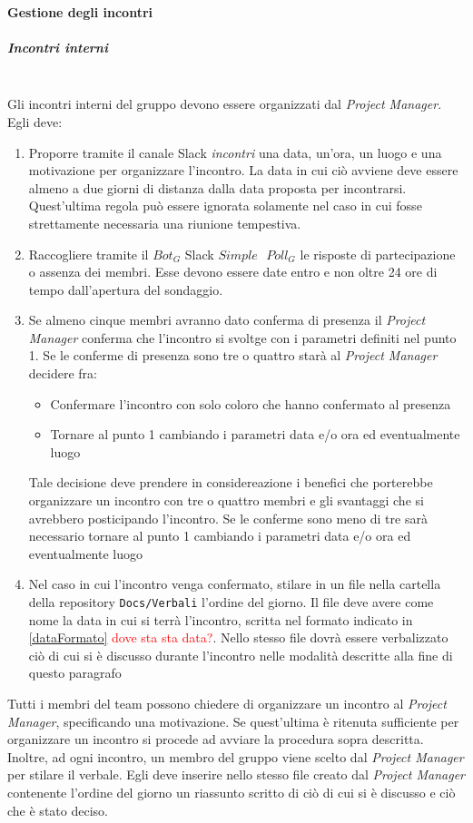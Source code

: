 		\paragraph{Gestione degli incontri}
			\subparagraph{Incontri interni} \mbox{} \\
			 Gli incontri interni del gruppo devono essere organizzati dal \emph{Project Manager}. Egli deve:
			\begin{enumerate}
				\item Proporre tramite il canale Slack \emph{incontri} una data, un'ora, un luogo e una motivazione per organizzare l'incontro. La data in cui ciò avviene deve essere almeno a due giorni di distanza dalla data proposta per incontrarsi. Quest'ultima regola può essere ignorata solamente nel caso in cui fosse strettamente necessaria una riunione tempestiva.
				
				\item Raccogliere tramite il $Bot_G$ Slack $Simple\textbf{ }Poll_G$ le risposte di partecipazione o assenza dei membri. Esse devono essere date entro e non oltre 24 ore di tempo dall'apertura del sondaggio.
				
				\item Se almeno cinque membri avranno dato conferma di presenza il \emph{Project Manager} conferma che l'incontro si svoltge con i parametri definiti nel punto 1. 
				Se le conferme di presenza sono tre o quattro starà al \emph{Project Manager} decidere fra: 
				\begin{itemize}
					\item Confermare l'incontro con solo coloro che hanno confermato al presenza
					\item Tornare al punto 1 cambiando i parametri data e/o ora ed eventualmente luogo
				\end{itemize}
				Tale decisione deve prendere in considereazione i benefici che porterebbe organizzare un incontro con tre o quattro membri e gli svantaggi che si avrebbero posticipando l'incontro.
				Se le conferme sono meno di tre sarà necessario tornare al punto 1 cambiando i parametri data e/o ora ed eventualmente luogo
				
				\item Nel caso in cui l'incontro venga confermato, stilare in un file nella cartella della repository \texttt{Docs/Verbali} l'ordine del giorno. Il file deve avere come nome la data in cui si terrà l'incontro, scritta nel formato indicato in \ref{dataFormato} \textcolor{red}{dove sta sta data?}. Nello stesso file dovrà essere verbalizzato ciò di cui si è discusso durante l'incontro nelle modalità descritte alla fine di questo paragrafo
			\end{enumerate}
			Tutti i membri del team possono chiedere di organizzare un incontro al \emph{Project Manager}, specificando una motivazione. Se quest'ultima è ritenuta sufficiente per organizzare un incontro si procede ad avviare la procedura sopra descritta. 
			\\Inoltre, ad ogni incontro, un membro del gruppo viene scelto dal \emph{Project Manager} per stilare il verbale. Egli deve inserire nello stesso file creato dal \emph{Project Manager} contenente l'ordine del giorno un riassunto scritto di ciò di cui si è discusso e ciò che è stato deciso.
			
